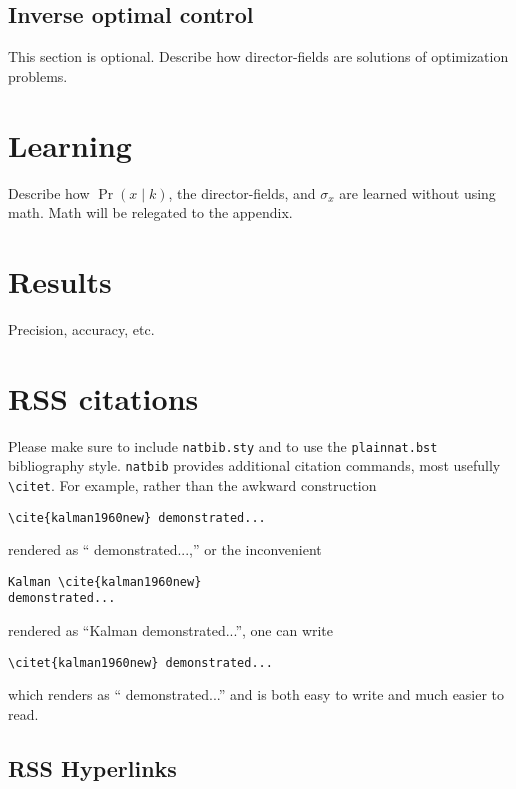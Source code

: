 \documentclass[conference]{IEEEtran}
\begin{document}
\subsection{Inverse optimal control}
This section is optional.  Describe how director-fields are solutions of optimization problems.

\section{Learning}
  Describe how $\Pr(x \mid k)$, the director-fields, and $\sigma_x$ are learned without using math.
  Math will be relegated to the appendix.
  
\section{Results}
 Precision, accuracy, etc.

\section{RSS citations}

Please make sure to include \verb!natbib.sty! and to use the
\verb!plainnat.bst! bibliography style. \verb!natbib! provides additional
citation commands, most usefully \verb!\citet!. For example, rather than the
awkward construction 

{\small
\begin{verbatim}
\cite{kalman1960new} demonstrated...
\end{verbatim}
}

\noindent
rendered as ``\cite{kalman1960new} demonstrated...,''
or the
inconvenient 

{\small
\begin{verbatim}
Kalman \cite{kalman1960new} 
demonstrated...
\end{verbatim}
}

\noindent
rendered as 
``Kalman \cite{kalman1960new} demonstrated...'', 
one can
write 

{\small
\begin{verbatim}
\citet{kalman1960new} demonstrated... 
\end{verbatim}
}
\noindent
which renders as ``\citet{kalman1960new} demonstrated...'' and is 
both easy to write and much easier to read.
  
\subsection{RSS Hyperlinks}
\end{document}

